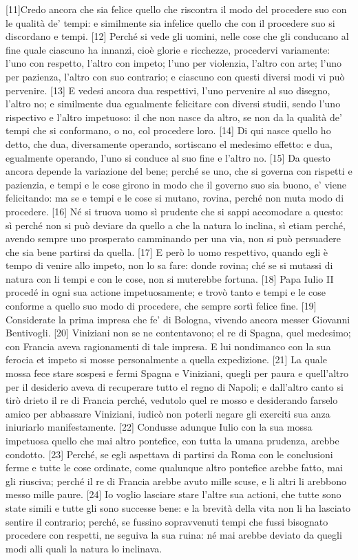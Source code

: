 {[}11{]}Credo ancora che sia felice quello che riscontra il modo del procedere suo con le qualità de' tempi: e similmente sia infelice quello che con il procedere suo si discordano e tempi. {[}12{]} Perché si vede gli uomini, nelle cose che gli conducano al fine quale ciascuno ha innanzi, cioè glorie e ricchezze, procedervi variamente: l'uno con respetto, l'altro con impeto; l'uno per violenzia, l'altro con arte; l'uno per pazienza, l'altro con suo contrario; e ciascuno con questi diversi modi vi può pervenire. {[}13{]} E vedesi ancora dua respettivi, l'uno pervenire al suo disegno, l'altro no; e similmente dua egualmente felicitare con diversi studii, sendo l'uno rispectivo e l'altro impetuoso: il che non nasce da altro, se non da la qualità de' tempi che si conformano, o no, col procedere loro. {[}14{]} Di qui nasce quello ho detto, che dua, diversamente operando, sortiscano el medesimo effetto: e dua, egualmente operando, l'uno si conduce al suo fine e l'altro no. {[}15{]} Da questo ancora depende la variazione del bene; perché se uno, che si governa con rispetti e pazienzia, e tempi e le cose girono in modo che il governo suo sia buono, e' viene felicitando: ma se e tempi e le cose si mutano, rovina, perché non muta modo di procedere. {[}16{]} Né si truova uomo sì prudente che si sappi accomodare a questo: sì perché non si può deviare da quello a che la natura lo inclina, sì etiam perché, avendo sempre uno prosperato camminando per una via, non si può persuadere che sia bene partirsi da quella. {[}17{]} E però lo uomo respettivo, quando egli è tempo di venire allo impeto, non lo sa fare: donde rovina; ché se si mutassi di natura con li tempi e con le cose, non si muterebbe fortuna. {[}18{]} Papa Iulio II procedé in ogni sua actione impetuosamente; e trovò tanto e tempi e le cose conforme a quello suo modo di procedere, che sempre sortì felice fine. {[}19{]} Considerate la prima impresa che fe' di Bologna, vivendo ancora messer Giovanni Bentivogli. {[}20{]} Viniziani non se ne contentavono; el re di Spagna, quel medesimo; con Francia aveva ragionamenti di tale impresa. E lui nondimanco con la sua ferocia et impeto si mosse personalmente a quella expedizione. {[}21{]} La quale mossa fece stare sospesi e fermi Spagna e Viniziani, quegli per paura e quell'altro per il desiderio aveva di recuperare tutto el regno di Napoli; e dall'altro canto si tirò drieto il re di Francia perché, vedutolo quel re mosso e  desiderando farselo amico per abbassare Viniziani, iudicò non poterli negare gli exerciti sua anza iniuriarlo manifestamente. {[}22{]} Condusse adunque Iulio con la sua mossa impetuosa quello che mai altro pontefice, con tutta la umana prudenza, arebbe condotto. {[}23{]} Perché, se egli aspettava di partirsi da Roma con le conclusioni ferme e tutte le cose ordinate, come qualunque altro pontefice arebbe fatto, mai gli riusciva; perché il re di Francia arebbe avuto mille scuse, e li altri li arebbono messo mille paure. {[}24{]} Io voglio lasciare stare l'altre sua actioni, che tutte sono state simili e tutte gli sono successe bene: e la brevità della vita non li ha lasciato sentire il contrario; perché, se fussino sopravvenuti tempi che fussi bisognato procedere con respetti, ne seguiva la sua ruina: né mai arebbe deviato da quegli modi alli quali la natura lo inclinava.

